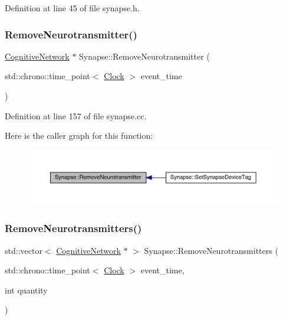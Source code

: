 Definition at line 45 of file synapse.\+h.

\mbox{\label{class_synapse_a29593ed2f05d60fcbf1db3e931ef5c53}} 
\subsubsection{\texorpdfstring{Remove\+Neurotransmitter()}{RemoveNeurotransmitter()}}
{\footnotesize\ttfamily \hyperlink{class_cognitive_network}{Cognitive\+Network} $\ast$ Synapse\+::\+Remove\+Neurotransmitter (\begin{DoxyParamCaption}\item[{std\+::chrono\+::time\+\_\+point$<$ \hyperlink{universe_8h_a0ef8d951d1ca5ab3cfaf7ab4c7a6fd80}{Clock} $>$}]{event\+\_\+time }\end{DoxyParamCaption})}



Definition at line 157 of file synapse.\+cc.

Here is the caller graph for this function\+:\nopagebreak
\begin{figure}[H]
\begin{center}
\leavevmode
\includegraphics[width=350pt]{class_synapse_a29593ed2f05d60fcbf1db3e931ef5c53_icgraph}
\end{center}
\end{figure}
\mbox{\label{class_synapse_adcf623e56f90e07344537d71c0a5d51b}} 
\subsubsection{\texorpdfstring{Remove\+Neurotransmitters()}{RemoveNeurotransmitters()}}
{\footnotesize\ttfamily std\+::vector$<$ \hyperlink{class_cognitive_network}{Cognitive\+Network} $\ast$ $>$ Synapse\+::\+Remove\+Neurotransmitters (\begin{DoxyParamCaption}\item[{std\+::chrono\+::time\+\_\+point$<$ \hyperlink{universe_8h_a0ef8d951d1ca5ab3cfaf7ab4c7a6fd80}{Clock} $>$}]{event\+\_\+time,  }\item[{int}]{quantity }\end{DoxyParamCaption})}



